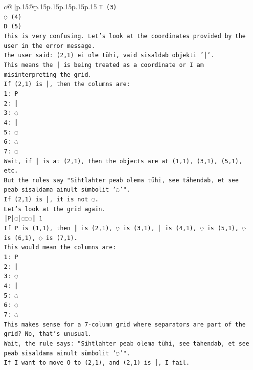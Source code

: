 \documentclass{article}
\begin{document}
{\begin{supertabular}{c@{$\;$}|p{.15\linewidth}@{}p{.15\linewidth}p{.15\linewidth}p{.15\linewidth}p{.15\linewidth}p{.15\linewidth}}
{{{\texttt{T (3)} \\
\texttt{◌ (4)} \\
\texttt{D (5)} \\
\texttt{This is very confusing. Let's look at the coordinates provided by the user in the error message.} \\
\texttt{The user said: (2,1) ei ole tühi, vaid sisaldab objekti '│'.} \\
\texttt{This means the │ is being treated as a coordinate or I am misinterpreting the grid.} \\
\texttt{If (2,1) is │, then the columns are:} \\
\texttt{1: P} \\
\texttt{2: │} \\
\texttt{3: ◌} \\
\texttt{4: │} \\
\texttt{5: ◌} \\
\texttt{6: ◌} \\
\texttt{7: ◌} \\
\texttt{Wait, if │ is at (2,1), then the objects are at (1,1), (3,1), (5,1), etc.} \\
\texttt{But the rules say "Sihtlahter peab olema tühi, see tähendab, et see peab sisaldama ainult sümbolit '◌'".} \\
\texttt{If (2,1) is │, it is not ◌.} \\
\texttt{Let's look at the grid again.} \\
\texttt{║P│◌│◌◌◌║ 1} \\
\texttt{If P is (1,1), then │ is (2,1), ◌ is (3,1), │ is (4,1), ◌ is (5,1), ◌ is (6,1), ◌ is (7,1).} \\
\texttt{This would mean the columns are:} \\
\texttt{1: P} \\
\texttt{2: │} \\
\texttt{3: ◌} \\
\texttt{4: │} \\
\texttt{5: ◌} \\
\texttt{6: ◌} \\
\texttt{7: ◌} \\
\texttt{This makes sense for a 7{-}column grid where separators are part of the grid? No, that's unusual.} \\
\texttt{Wait, the rule says: "Sihtlahter peab olema tühi, see tähendab, et see peab sisaldama ainult sümbolit '◌'".} \\
\texttt{If I want to move O to (2,1), and (2,1) is │, I fail.} \\
}}}
\end{supertabular}}
\end{document}
